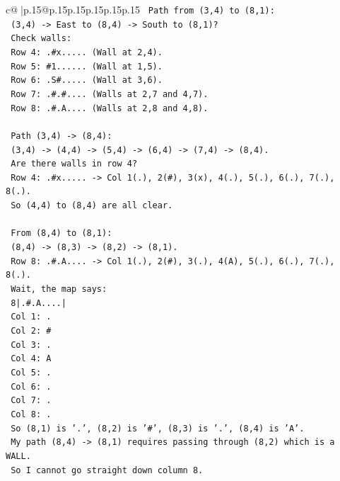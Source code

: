 \documentclass{article}
\begin{document}
{\begin{supertabular}{c@{$\;$}|p{.15\linewidth}@{}p{.15\linewidth}p{.15\linewidth}p{.15\linewidth}p{.15\linewidth}p{.15\linewidth}}
{{{\texttt{   Path from (3,4) to (8,1):} \\
\texttt{   (3,4) {-}> East to (8,4) {-}> South to (8,1)?} \\
\texttt{   Check walls:} \\
\texttt{   Row 4: .\#x..... (Wall at 2,4).} \\
\texttt{   Row 5: \#1...... (Wall at 1,5).} \\
\texttt{   Row 6: .S\#..... (Wall at 3,6).} \\
\texttt{   Row 7: .\#.\#.... (Walls at 2,7 and 4,7).} \\
\texttt{   Row 8: .\#.A.... (Walls at 2,8 and 4,8).} \\
\\ 
\texttt{   Path (3,4) {-}> (8,4):} \\
\texttt{   (3,4) {-}> (4,4) {-}> (5,4) {-}> (6,4) {-}> (7,4) {-}> (8,4).} \\
\texttt{   Are there walls in row 4?} \\
\texttt{   Row 4: .\#x..... {-}> Col 1(.), 2(\#), 3(x), 4(.), 5(.), 6(.), 7(.), 8(.).} \\
\texttt{   So (4,4) to (8,4) are all clear.} \\
\\ 
\texttt{   From (8,4) to (8,1):} \\
\texttt{   (8,4) {-}> (8,3) {-}> (8,2) {-}> (8,1).} \\
\texttt{   Row 8: .\#.A.... {-}> Col 1(.), 2(\#), 3(.), 4(A), 5(.), 6(.), 7(.), 8(.).} \\
\texttt{   Wait, the map says:} \\
\texttt{   8|.\#.A....|} \\
\texttt{   Col 1: .} \\
\texttt{   Col 2: \#} \\
\texttt{   Col 3: .} \\
\texttt{   Col 4: A} \\
\texttt{   Col 5: .} \\
\texttt{   Col 6: .} \\
\texttt{   Col 7: .} \\
\texttt{   Col 8: .} \\
\texttt{   So (8,1) is '.', (8,2) is '\#', (8,3) is '.', (8,4) is 'A'.} \\
\texttt{   My path (8,4) {-}> (8,1) requires passing through (8,2) which is a WALL.} \\
\texttt{   So I cannot go straight down column 8.} \\
\\ 
}}}
\end{supertabular}}
\end{document}
